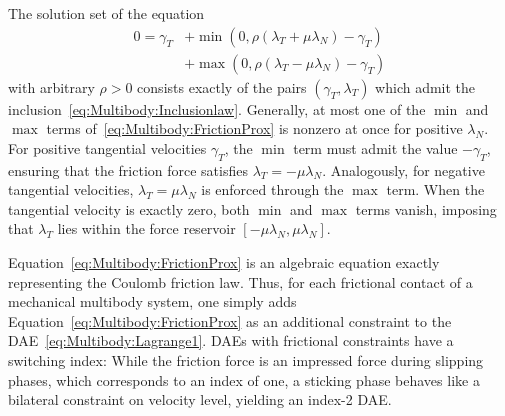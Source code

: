 \documentclass[a4paper, nonatbib, 3p, twocolumn]{elsarticle}
\theoremstyle{plain}
\theoremstyle{definition}
\theoremstyle{remark}
\begin{document}
The solution set of the equation
\begin{equation}\label{eq:Multibody:FrictionProx}
    \begin{aligned}
	0 = \gamma_{T} &+ \min\left(0,\rho(\lambda_{T}+\mu\lambda_{N}) - \gamma_{T}\right) \\
    &+ \max\left(0,\rho(\lambda_{T}-\mu\lambda_{N}) - \gamma_{T}\right)
    \end{aligned}
\end{equation}
with arbitrary $\rho>0$ consists exactly of the pairs $(\gamma_T, \lambda_T)$ which admit the inclusion~\eqref{eq:Multibody:Inclusionlaw}.
Generally, at most one of the $\min$ and $\max$ terms of~\eqref{eq:Multibody:FrictionProx} is nonzero at once for positive $\lambda_N$. For  positive tangential velocities $\gamma_T$, the $\min$ term must admit the value $-\gamma_T$, ensuring that the friction force satisfies $\lambda_T = -\mu \lambda_N$. Analogously, for negative tangential velocities, $\lambda_T = \mu \lambda_N$ is enforced through the $\max$ term. When the tangential velocity is exactly zero, both $\min$ and $\max$ terms vanish, imposing that $\lambda_T$ lies within the force reservoir $[-\mu \lambda_N, \mu \lambda_N]$. 

Equation~\eqref{eq:Multibody:FrictionProx} is an algebraic equation exactly representing the Coulomb friction law. Thus, for each frictional contact of a mechanical multibody system, one simply adds Equation~\eqref{eq:Multibody:FrictionProx} as an additional constraint to the DAE~\eqref{eq:Multibody:Lagrange1}.
DAEs with frictional constraints have a switching index: While the friction force is an impressed force during slipping phases, which corresponds to an index of one, a sticking phase behaves like a bilateral constraint on velocity level, yielding an index-2 DAE.
\end{document}
